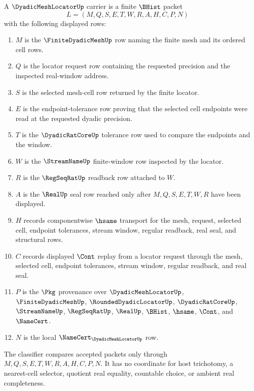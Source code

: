 \begin{definition}
\label{def:dyadic-mesh-locator-carrier}
A $\DyadicMeshLocatorUp$ carrier is a finite $\BHist$ packet
$$
L=(M,Q,S,E,T,W,R,A,H,C,P,N)
$$
with the following displayed rows:
\begin{enumerate}
\item $M$ is the $\FiniteDyadicMeshUp$ row naming the finite mesh and its ordered cell rows.
\item $Q$ is the locator request row containing the requested precision and the inspected real-window address.
\item $S$ is the selected mesh-cell row returned by the finite locator.
\item $E$ is the endpoint-tolerance row proving that the selected cell endpoints were read at the requested dyadic precision.
\item $T$ is the $\DyadicRatCoreUp$ tolerance row used to compare the endpoints and the window.
\item $W$ is the $\StreamNameUp$ finite-window row inspected by the locator.
\item $R$ is the $\RegSeqRatUp$ readback row attached to $W$.
\item $A$ is the $\RealUp$ seal row reached only after $M,Q,S,E,T,W,R$ have been displayed.
\item $H$ records componentwise $\hsame$ transport for the mesh, request, selected cell, endpoint tolerances, stream window, regular readback, real seal, and structural rows.
\item $C$ records displayed $\Cont$ replay from a locator request through the mesh, selected cell, endpoint tolerances, stream window, regular readback, and real seal.
\item $P$ is the $\Pkg$ provenance over $\DyadicMeshLocatorUp$, $\FiniteDyadicMeshUp$, $\RoundedDyadicLocatorUp$, $\DyadicRatCoreUp$, $\StreamNameUp$, $\RegSeqRatUp$, $\RealUp$, $\BHist$, $\hsame$, $\Cont$, and $\NameCert$.
\item $N$ is the local $\NameCert_{\DyadicMeshLocatorUp}$ row.
\end{enumerate}
The classifier compares accepted packets only through $M,Q,S,E,T,W,R,A,H,C,P,N$. It has no coordinate for host trichotomy, a nearest-cell selector, quotient real equality, countable choice, or ambient real completeness.
\end{definition}

